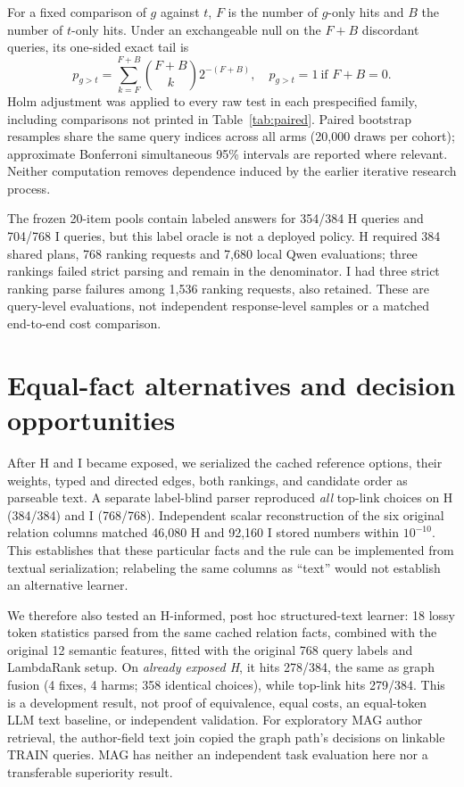 \documentclass{article}
\begin{document}
For a fixed comparison of $g$ against $t$, $F$ is the number of
$g$-only hits and $B$ the number of $t$-only hits. Under an exchangeable
null on the $F+B$ discordant queries, its one-sided exact tail is
\begin{equation}\label{eq:exact}
 p_{g>t}=\sum_{k=F}^{F+B}\binom{F+B}{k}2^{-(F+B)},
 \quad p_{g>t}=1\ \text{if }F+B=0.
\end{equation}
Holm adjustment was applied to every raw test in each prespecified family,
including comparisons not printed in Table~\ref{tab:paired}. Paired bootstrap
resamples share the same query indices across all arms (20,000 draws per
cohort); approximate Bonferroni simultaneous 95\% intervals are reported
where relevant. Neither computation removes dependence induced by the
earlier iterative research process.

The frozen 20-item pools contain labeled answers for 354/384 H queries and
704/768 I queries, but this label oracle is not a deployed policy. H required
384 shared plans, 768 ranking requests and 7,680 local Qwen evaluations;
three rankings failed strict parsing and remain in the denominator. I had
three strict ranking parse failures among 1,536 ranking requests, also
retained. These are query-level evaluations, not independent response-level
samples or a matched end-to-end cost comparison.

\section{Equal-fact alternatives and decision opportunities}
After H and I became exposed, we serialized the cached reference options,
their weights, typed and directed edges, both rankings, and candidate order
as parseable text. A separate label-blind parser reproduced \emph{all} top-link
choices on H (384/384) and I (768/768). Independent scalar reconstruction of
the six original relation columns matched 46,080 H and 92,160 I stored
numbers within $10^{-10}$. This establishes that these particular facts and
the rule can be implemented from textual serialization; relabeling the same
columns as ``text'' would not establish an alternative learner.

We therefore also tested an H-informed, post hoc structured-text learner:
18 lossy token statistics parsed from the same cached relation facts, combined
with the original 12 semantic features, fitted with the original 768 query
labels and LambdaRank setup. On \emph{already exposed H}, it hits 278/384,
the same as graph fusion (4 fixes, 4 harms; 358 identical choices), while
top-link hits 279/384. This is a development result, not proof of equivalence,
equal costs, an equal-token LLM text baseline, or independent validation.
For exploratory MAG author retrieval, the author-field text join copied the
graph path's decisions on linkable TRAIN queries. MAG has neither an independent
task evaluation here nor a transferable superiority result.
\end{document}
